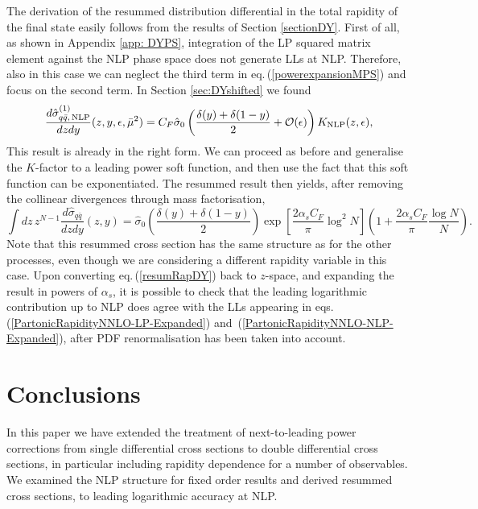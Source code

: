 \documentclass[11pt]{article}
\newcommand{\as}{\alpha_s}
\newcommand{\eps}{\epsilon}
\newcommand\eqn[1]     {eq.\,(\ref{#1})}
\newcommand\eqns[2]    {eqs.\,(\ref{#1}) and~(\ref{#2})}
\begin{document}
The derivation of the resummed distribution differential in the total rapidity of the final state easily follows from the results of Section \ref{sectionDY}. First of all, as shown in Appendix \ref{app: DYPS}, integration of the LP squared matrix element against the NLP phase space does not generate LLs at NLP. Therefore, also in this case we can neglect the third term in \eqn{powerexpansionMPS} and focus on the second term. In Section \ref{sec:DYshifted} we found
\begin{align}
\frac{d\hat{\sigma}^{(1)}_{q\bar q,\,\text{NLP}}}{dzdy}(z,y,\eps,\bar\mu^2) =C_F\hat\sigma_0 \left(\frac{\delta(y)+\delta(1-y)}{2}+\mathcal{O}(\eps)\right)K_{\rm{NLP}}(z,\eps),
\end{align}
This result is already in the right form. We can proceed as before and generalise the $K$-factor to a leading power soft function, and then use the fact that this soft function can be exponentiated. The resummed result then yields, after removing the collinear divergences through mass factorisation,
\begin{equation}\label{resumRapDY}
     \int dz\,z^{N-1} \frac{d\hat\sigma_{q\bar{q}}}{dzdy}(z,y)=\hat\sigma_0\left(\frac{\delta(y)+\delta(1-y)}{2}\right)\exp\left[\frac{2\alpha_sC_F}{\pi}\log^2N\right]\left(1+\frac{2\alpha_sC_F}{\pi}\frac{\log N}{N}\right).
\end{equation}
Note that this resummed cross section has the same structure as for the other processes, even though we are considering a different rapidity variable in this case. Upon converting \eqn{resumRapDY} back to $z$-space, and expanding the result in powers of $\as$, it is possible to check that the leading logarithmic contribution up to NLP does agree with the LLs appearing in \eqns{PartonicRapidityNNLO-LP-Expanded}{PartonicRapidityNNLO-NLP-Expanded}, after PDF renormalisation has been taken into account.


\section{Conclusions}\label{conclusions}
In this paper we have extended the treatment of next-to-leading power corrections from single differential cross sections to double differential cross sections,
in particular including rapidity dependence for a number of observables. We examined the NLP structure for fixed order results and derived resummed cross sections, 
to leading logarithmic accuracy at NLP.
\end{document}
